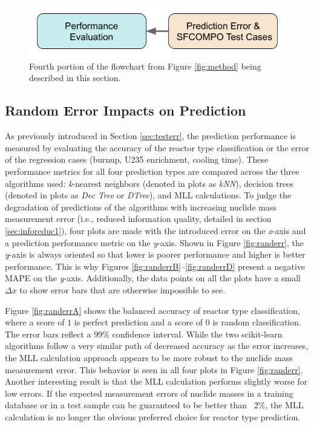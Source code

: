
\begin{figure}[H]
  \centering
  \includegraphics[width=0.7\linewidth]{./chapters/exp1/methodology4.png}
  \caption{Fourth portion of the flowchart from Figure \ref{fig:method} being 
           described in this section.}
\end{figure}

\subsection{Random Error Impacts on Prediction}
\label{sec:randerr}

As previously introduced in Section \ref{sec:testerr}, the prediction
performance is measured by evaluating the accuracy of the reactor type
classification or the error of the regression cases (burnup, \gls{U235}
enrichment, cooling time).  These performance metrics for all four prediction
types are compared across the three algorithms used: \textit{k}-nearest
neighbors (denoted in plots as \textit{kNN}), decision trees (denoted in plots
as \textit{Dec Tree} or \textit{DTree}), and \gls{MLL} calculations.  To judge
the degradation of predictions of the algorithms with increasing nuclide mass
measurement error (i.e., reduced information quality, detailed in section
\ref{sec:inforeduc1}), four plots are made with the introduced error on the
\textit{x}-axis and a prediction performance metric on the \textit{y}-axis.
Shown in Figure \ref{fig:randerr}, the \textit{y}-axis is always oriented so
that lower is poorer performance and higher is better performance. This is why
Figures \ref{fig:randerrB}--\ref{fig:randerrD} present a negative \gls{MAPE} on
the \textit{y}-axis. Additionally, the data points on all the plots have a
small $\Delta x$ to show error bars that are otherwise impossible to see.

Figure \ref{fig:randerrA} shows the balanced accuracy of reactor type
classification, where a score of $1$ is perfect prediction and a score of $0$
is random classification. The error bars reflect a 99\% confidence interval.
While the two scikit-learn algorithms follow a very similar path of decreased
accuracy as the error increases, the \gls{MLL} calculation approach appears to
be more robust to the nuclide mass measurement error. This behavior is seen in
all four plots in Figure \ref{fig:randerr}. Another interesting result is that
the \gls{MLL} calculation performs slightly worse for low errors. If the
expected measurement errors of nuclide masses in a training database or in a
test sample can be guaranteed to be better than ~2\%, the \gls{MLL} calculation
is no longer the obvious preferred choice for reactor type prediction.

